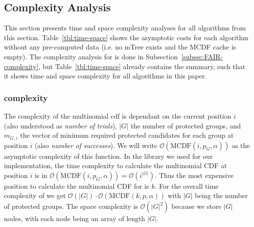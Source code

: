 \subsection{Complexity Analysis}
\begin{table}[b!]
	\caption{Time complexity for all algorithms without pre-computed results.\label{tbl:time-space}}
\end{table}

This section presents time and space complexity analyses for all algorithms from this section.
%
Table~\ref{tbl:time-space} shows the asymptotic costs for each algorithm without any pre-computed data (i.e. no mTree exists and the MCDF cache is empty).
%
The complexity analysis for \algoFAIR is done in Subsection~\ref{subsec:FAIR-complexity}, but Table~\ref{tbl:time-space} already contains the summary, such that it shows time and space complexity for all algorithms in this paper.

\subsubsection{\algoImcdf complexity}\label{subsubsec:imcdf-complexity}
The complexity of the multinomial cdf is dependant on the current position $i$ (also understood as \textit{number of trials}), $|G|$ the number of protected groups, and $m_{G,i}$ the vector of minimum required protected candidates for each group at position $i$ (also \textit{number of successes}).
%
We will write $\mathcal{O}(\text{MCDF}(i,p_G,\alpha))$ as the asymptotic complexity of this function.
%
In the library we used for our implementation, the time complexity to calculate the multinomial CDF at position $i$ is in $\mathcal{O}(\text{MCDF}(i,p_G,\alpha)) = \mathcal{O}(i^{|G|})$.
%
Thus the most expensive position to calculate the multinomial CDF for is $k$.
%
For the overall time complexity of \algoImcdf we get $\mathcal{O}(|G|) \cdot \mathcal{O}(\text{MCDF}(k,p,\alpha ))$ with $|G|$ being the number of protected groups.
%
The space complexity is $\mathcal{O}(|G|^2)$ because we store $|G|$ nodes, with each node being an array of length $|G|$.
%
